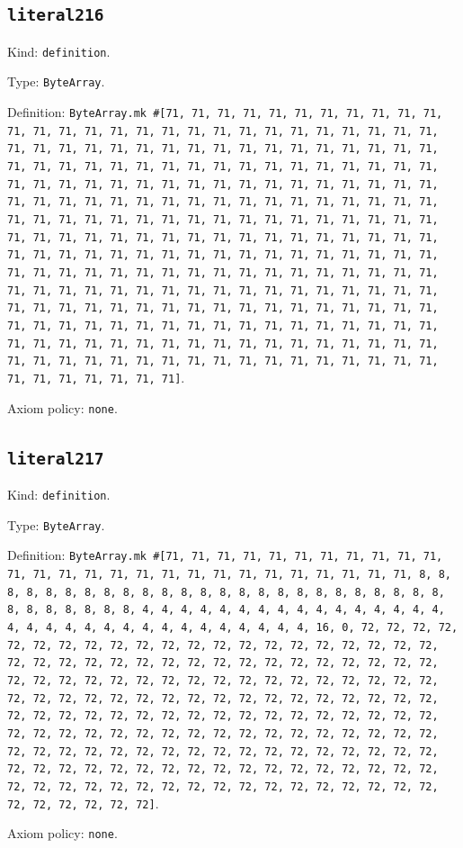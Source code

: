 \documentclass[11pt]{article}
\begin{document}
\subsection*{\texttt{literal216}}
\noindent Kind: \texttt{definition}.\par
\noindent Type: \texttt{ByteArray}.\par
\noindent Definition: \texttt{ByteArray.mk \#[71, 71, 71, 71, 71, 71, 71, 71, 71, 71, 71, 71, 71, 71, 71, 71, 71, 71, 71, 71, 71, 71, 71, 71, 71, 71, 71, 71, 71, 71, 71, 71, 71, 71, 71, 71, 71, 71, 71, 71, 71, 71, 71, 71, 71, 71, 71, 71, 71, 71, 71, 71, 71, 71, 71, 71, 71, 71, 71, 71, 71, 71, 71, 71, 71, 71, 71, 71, 71, 71, 71, 71, 71, 71, 71, 71, 71, 71, 71, 71, 71, 71, 71, 71, 71, 71, 71, 71, 71, 71, 71, 71, 71, 71, 71, 71, 71, 71, 71, 71, 71, 71, 71, 71, 71, 71, 71, 71, 71, 71, 71, 71, 71, 71, 71, 71, 71, 71, 71, 71, 71, 71, 71, 71, 71, 71, 71, 71, 71, 71, 71, 71, 71, 71, 71, 71, 71, 71, 71, 71, 71, 71, 71, 71, 71, 71, 71, 71, 71, 71, 71, 71, 71, 71, 71, 71, 71, 71, 71, 71, 71, 71, 71, 71, 71, 71, 71, 71, 71, 71, 71, 71, 71, 71, 71, 71, 71, 71, 71, 71, 71, 71, 71, 71, 71, 71, 71, 71, 71, 71, 71, 71, 71, 71, 71, 71, 71, 71, 71, 71, 71, 71, 71, 71, 71, 71, 71, 71, 71, 71, 71, 71, 71, 71, 71, 71, 71, 71, 71, 71, 71, 71, 71, 71, 71, 71, 71, 71, 71, 71, 71, 71, 71, 71, 71, 71, 71, 71, 71, 71, 71, 71, 71, 71, 71, 71, 71, 71, 71, 71, 71, 71, 71, 71, 71, 71]}.\par
\noindent Axiom policy: \texttt{none}.\par
\subsection*{\texttt{literal217}}
\noindent Kind: \texttt{definition}.\par
\noindent Type: \texttt{ByteArray}.\par
\noindent Definition: \texttt{ByteArray.mk \#[71, 71, 71, 71, 71, 71, 71, 71, 71, 71, 71, 71, 71, 71, 71, 71, 71, 71, 71, 71, 71, 71, 71, 71, 71, 71, 71, 8, 8, 8, 8, 8, 8, 8, 8, 8, 8, 8, 8, 8, 8, 8, 8, 8, 8, 8, 8, 8, 8, 8, 8, 8, 8, 8, 8, 8, 8, 8, 8, 4, 4, 4, 4, 4, 4, 4, 4, 4, 4, 4, 4, 4, 4, 4, 4, 4, 4, 4, 4, 4, 4, 4, 4, 4, 4, 4, 4, 4, 4, 4, 4, 16, 0, 72, 72, 72, 72, 72, 72, 72, 72, 72, 72, 72, 72, 72, 72, 72, 72, 72, 72, 72, 72, 72, 72, 72, 72, 72, 72, 72, 72, 72, 72, 72, 72, 72, 72, 72, 72, 72, 72, 72, 72, 72, 72, 72, 72, 72, 72, 72, 72, 72, 72, 72, 72, 72, 72, 72, 72, 72, 72, 72, 72, 72, 72, 72, 72, 72, 72, 72, 72, 72, 72, 72, 72, 72, 72, 72, 72, 72, 72, 72, 72, 72, 72, 72, 72, 72, 72, 72, 72, 72, 72, 72, 72, 72, 72, 72, 72, 72, 72, 72, 72, 72, 72, 72, 72, 72, 72, 72, 72, 72, 72, 72, 72, 72, 72, 72, 72, 72, 72, 72, 72, 72, 72, 72, 72, 72, 72, 72, 72, 72, 72, 72, 72, 72, 72, 72, 72, 72, 72, 72, 72, 72, 72, 72, 72, 72, 72, 72, 72, 72, 72, 72, 72, 72, 72, 72, 72, 72, 72, 72, 72, 72, 72, 72]}.\par
\noindent Axiom policy: \texttt{none}.\par
\end{document}
